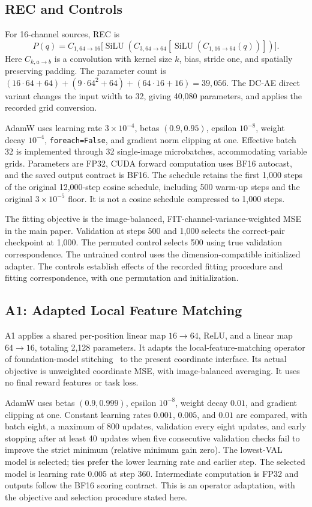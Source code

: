 \documentclass[10pt,twocolumn,letterpaper]{article}
\begin{document}
\subsection{REC and Controls}
For 16-channel sources, REC is
\begin{equation}
 P(q)=C_{1,64\to16}\big[\operatorname{SiLU}(C_{3,64\to64}[\operatorname{SiLU}(C_{1,16\to64}(q))])\big].
\end{equation}
Here $C_{k,a\to b}$ is a convolution with kernel size $k$, bias, stride one, and spatially preserving padding. The parameter count is
$(16\cdot64+64)+(9\cdot64^2+64)+(64\cdot16+16)=39,056$.
The DC-AE direct variant changes the input width to 32, giving 40,080 parameters, and applies the recorded grid conversion.

AdamW uses learning rate $3\times10^{-4}$, betas $(0.9,0.95)$, epsilon $10^{-8}$, weight decay $10^{-4}$, \texttt{foreach=False}, and gradient norm clipping at one. Effective batch 32 is implemented through 32 single-image microbatches, accommodating variable grids. Parameters are FP32, CUDA forward computation uses BF16 autocast, and the saved output contract is BF16. The schedule retains the first 1,000 steps of the original 12,000-step cosine schedule, including 500 warm-up steps and the original $3\times10^{-5}$ floor. It is not a cosine schedule compressed to 1,000 steps.

The fitting objective is the image-balanced, FIT-channel-variance-weighted MSE in the main paper. Validation at steps 500 and 1,000 selects the correct-pair checkpoint at 1,000. The permuted control selects 500 using true validation correspondence. The untrained control uses the dimension-compatible initialized adapter. The controls establish effects of the recorded fitting procedure and fitting correspondence, with one permutation and initialization.

\subsection{A1: Adapted Local Feature Matching}
A1 applies a shared per-position linear map $16\to64$, ReLU, and a linear map $64\to16$, totaling 2,128 parameters. It adapts the local-feature-matching operator of foundation-model stitching~\cite{mai2026revisiting} to the present coordinate interface. Its actual objective is unweighted coordinate MSE, with image-balanced averaging. It uses no final reward features or task loss.

AdamW uses betas $(0.9,0.999)$, epsilon $10^{-8}$, weight decay $0.01$, and gradient clipping at one. Constant learning rates $0.001$, $0.005$, and $0.01$ are compared, with batch eight, a maximum of 800 updates, validation every eight updates, and early stopping after at least 40 updates when five consecutive validation checks fail to improve the strict minimum (relative minimum gain zero). The lowest-VAL model is selected; ties prefer the lower learning rate and earlier step. The selected model is learning rate $0.005$ at step 360. Intermediate computation is FP32 and outputs follow the BF16 scoring contract. This is an operator adaptation, with the objective and selection procedure stated here.
\end{document}
